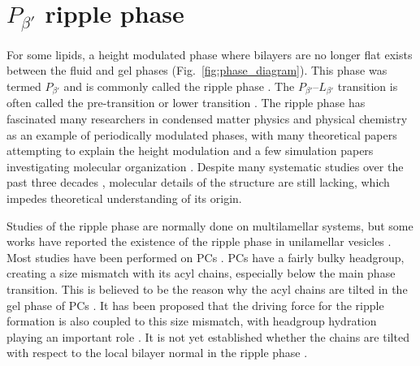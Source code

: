 \section{$P_{\beta'}$ ripple phase}\label{sec:ripple_phase}
For some lipids, a height modulated phase where
bilayers are no longer flat exists between the fluid and gel phases
(Fig.~\ref{fig:phase_diagram}). 
This phase was termed $P_{\beta'}$ 
and is commonly called the ripple phase \cite{ref:Tardieu73}. 
The $P_{\beta'}$--$L_{\beta'}$ transition is often
called the pre-transition \cite{ref:Wack89} or lower transition \cite{Nagle00}.
The ripple phase has fascinated many researchers in condensed matter physics
and physical chemistry as an example of periodically modulated phases,
with many theoretical papers attempting to explain the height modulation
\cite{ref:Doniach79,ref:Marder84,ref:Hawton86,ref:Carlson87,ref:Goldstein88,ref:McCullough90,ref:Honda91,ref:Lubensky93,ref:Sengupta01,ref:Kamal11}
and a few simulation papers investigating molecular organization 
\cite{ref:deVries05,ref:Lenz07,ref:Scott84,ref:Debnath09}.
Despite many systematic studies over the past three decades
\cite{ref:Tardieu73,ref:Janiak76,ref:Copeland80,ref:Ruppel83,ref:Zasadzinski87,ref:Wack89,ref:Sun96,ref:Katsaras00,ref:Sengupta03}, 
molecular details of the structure are still lacking, which impedes
theoretical understanding of its origin.

Studies of the ripple phase are normally done on multilamellar systems, but
some works have reported the existence of the ripple phase in unilamellar vesicles
\cite{ref:Mason99,ref:Parente84}.
Most studies have been performed on PCs \cite{Nagle00}.
PCs have a fairly bulky headgroup, creating a size mismatch with its acyl chains,
especially below the main phase transition. This is believed to be the 
reason why the acyl chains are tilted in the gel phase of PCs \cite{Nagle00,ref:Mcintosh80,ref:Nagle76}.
It has been proposed that the driving force for the ripple formation is also 
coupled to this size mismatch, with headgroup hydration playing an important role
\cite{ref:Cevc91,ref:Carlson87}.
It is not yet established whether the chains are tilted 
with respect to the local bilayer normal in the ripple phase \cite{ref:Sun96}.

